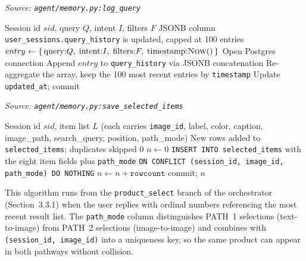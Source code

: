 \begin{algorithm}[H]
\caption{Append a Query Entry to Session History}\label{alg:log_query_history}
\textit{Source: \texttt{agent/memory.py:log\_query}}
\begin{algorithmic}[1]
\Require Session id $sid$, query $Q$, intent $I$, filters $F$
\Ensure JSONB column \texttt{user\_sessions.query\_history} is updated, capped at 100 entries
    \State $entry \gets \{\,\text{query}{:}Q,\;\text{intent}{:}I,\;\text{filters}{:}F,\;\text{timestamp}{:}\textsc{Now}()\,\}$
    \State Open Postgres connection
    \State Append $entry$ to \texttt{query\_history} via JSONB concatenation
    \State Re-aggregate the array, keep the 100 most recent entries by \texttt{timestamp}
    \State Update \texttt{updated\_at}; commit
\EndFunction
\end{algorithmic}
\end{algorithm}

\begin{algorithm}[H]
\caption{Save Confirmed Selections to \texttt{selected\_items}}\label{alg:save_selected_items}
\textit{Source: \texttt{agent/memory.py:save\_selected\_items}}
\begin{algorithmic}[1]
\Require Session id $sid$, item list $L$ (each carries \texttt{image\_id}, label, color, caption, image\_path, search\_query, position, path\_mode)
\Ensure New rows added to \texttt{selected\_items}; duplicates skipped
    \State \Return $0$\EndIf
    \State $n \gets 0$
        \State \texttt{INSERT INTO selected\_items} with the eight item fields plus \texttt{path\_mode}
        \State \texttt{ON CONFLICT (session\_id, image\_id, path\_mode) DO NOTHING}
        \State $n \gets n + \texttt{rowcount}$
    \EndFor
    \State commit; \Return $n$
\EndFunction
\end{algorithmic}
\end{algorithm}

This algorithm runs from the \texttt{product\_select} branch of the orchestrator (Section~3.3.1) when the user replies with ordinal numbers referencing the most recent result list. The \texttt{path\_mode} column distinguishes PATH~1 selections (text-to-image) from PATH~2 selections (image-to-image) and combines with \texttt{(session\_id, image\_id)} into a uniqueness key, so the same product can appear in both pathways without collision.

